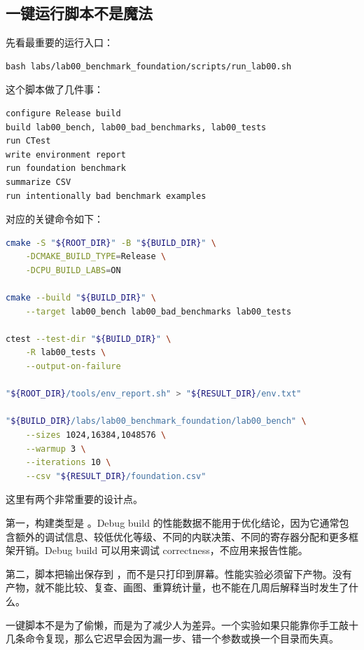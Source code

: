 \subsection{一键运行脚本不是魔法}

先看最重要的运行入口：

\begin{lstlisting}
bash labs/lab00_benchmark_foundation/scripts/run_lab00.sh
\end{lstlisting}

这个脚本做了几件事：

\begin{lstlisting}
configure Release build
build lab00_bench, lab00_bad_benchmarks, lab00_tests
run CTest
write environment report
run foundation benchmark
summarize CSV
run intentionally bad benchmark examples
\end{lstlisting}

对应的关键命令如下：

\begin{lstlisting}[language=bash]
cmake -S "${ROOT_DIR}" -B "${BUILD_DIR}" \
    -DCMAKE_BUILD_TYPE=Release \
    -DCPU_BUILD_LABS=ON

cmake --build "${BUILD_DIR}" \
    --target lab00_bench lab00_bad_benchmarks lab00_tests

ctest --test-dir "${BUILD_DIR}" \
    -R lab00_tests \
    --output-on-failure

"${ROOT_DIR}/tools/env_report.sh" > "${RESULT_DIR}/env.txt"

"${BUILD_DIR}/labs/lab00_benchmark_foundation/lab00_bench" \
    --sizes 1024,16384,1048576 \
    --warmup 3 \
    --iterations 10 \
    --csv "${RESULT_DIR}/foundation.csv"
\end{lstlisting}

这里有两个非常重要的设计点。

第一，构建类型是 \code{Release}。Debug build 的性能数据不能用于优化结论，因为它通常包含额外的调试信息、较低优化等级、不同的内联决策、不同的寄存器分配和更多框架开销。Debug build 可以用来调试 correctness，不应用来报告性能。

第二，脚本把输出保存到 ，而不是只打印到屏幕。性能实验必须留下产物。没有产物，就不能比较、复查、画图、重算统计量，也不能在几周后解释当时发生了什么。

\begin{warningbox}
一键脚本不是为了偷懒，而是为了减少人为差异。一个实验如果只能靠你手工敲十几条命令复现，那么它迟早会因为漏一步、错一个参数或换一个目录而失真。
\end{warningbox}

